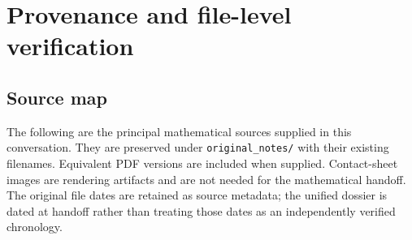 \chapter{Provenance and file-level verification}\label{ch:provenance}
\section{Source map}
The following are the principal mathematical sources supplied in this conversation.
They are preserved under \texttt{original\_notes/} with their existing filenames.
Equivalent PDF versions are included when supplied. Contact-sheet images are
rendering artifacts and are not needed for the mathematical handoff. The original
file dates are retained as source metadata; the unified dossier is dated at
handoff rather than treating those dates as an independently verified chronology.

